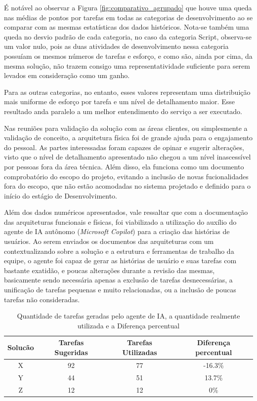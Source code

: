 	É notável ao observar a Figura \ref{fig:comparativo_agrupado} que houve uma queda nas médias de pontos por tarefas em todas as categorias de desenvolvimento ao se comparar com as mesmas estatísticas dos dados históricos.
	Nota-se também uma queda no desvio padrão de cada categoria, no caso da categoria Script, observa-se um valor nulo, pois as duas atividades de desenvolvimento nessa categoria
	possuíam os mesmos números de tarefas e esforço, e como são, ainda por cima, da mesma solução, não trazem consigo uma representatividade suficiente para serem levados em consideração como um ganho.

	Para as outras categorias, no entanto, esses valores representam uma distribuição mais uniforme de esforço por tarefa e um nível de detalhamento maior. Esse resultado anda paralelo a 
	um melhor entendimento do serviço a ser executado.

	Nas reuniões para validação da solução com as áreas clientes, ou simplesmente a validação de conceito, a arquitetura física foi de grande ajuda para o engajamento do pessoal. As partes interessadas
	foram capazes de opinar e sugerir alterações, visto que o nível de detalhamento apresentado não chegou a um nível inascessível por pessoas fora da área técnica. Além disso, ela funciona como um documento comprobatório do escopo do projeto, evitando a
	inclusão de novas fucionalidades fora do escopo, que não estão acomodadas no sistema projetado e definido para o início do estágio de Desenvolvimento.


	Além dos dados numéricos apresentados, vale ressaltar que com a documentação das arquiteturas funcionais e físicas, foi viabilizado a utilização do auxílio
	do agente de IA autônomo (\textit{Microsoft Copilot}) para a criação das histórias de usuários. Ao serem enviados os documentos das arquiteturas com um  contextualizando sobre a solução e
	a estrutura e ferramentas de trabalho da equipe, o agente foi capaz de gerar as histórias de usuário e suas tarefas com bastante exatidão, e poucas alterações durante a
	revisão das mesmas, basicamente sendo necessária apenas a exclusão de tarefas desnecessárias, a unificação de tarefas pequenas e muito relacionadas, ou a inclusão de poucas tarefas não consideradas.

	\begin{table}[!htb]
		\centering
		\begin{tabular}{cccc}
			\toprule
			\textbf{Solucão} & \textbf{Tarefas Sugeridas} & \textbf{Tarefas Utilizadas} & \textbf{Diferença percentual} \\
			\midrule
			X & 92  & 77 & -16.3\% \\
			Y & 44  & 51 & 13.7\% \\
			Z & 12  & 12 & 0\% \\
			\bottomrule
		\end{tabular}
		\caption{Quantidade de tarefas geradas pelo agente de IA, a quantidade realmente utilizada e a Diferença percentual}
		\label{tab:tarefas_copilot}
	\end{table}
	
